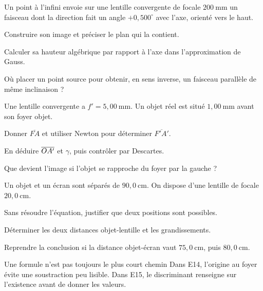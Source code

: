 Un point à l'infini envoie sur une lentille convergente de focale $200\ \mathrm{mm}$ un faisceau dont la direction fait un angle $+0{,}500^\circ$ avec l'axe, orienté vers le haut.
\begin{questions}
\item Construire son image et préciser le plan qui la contient.
\item Calculer sa hauteur algébrique par rapport à l'axe dans l'approximation de Gauss.
\item Où placer un point source pour obtenir, en sens inverse, un faisceau parallèle de même inclinaison ?
\end{questions}
Une lentille convergente a $f'=5{,}00\ \mathrm{mm}$. Un objet réel est situé $1{,}00\ \mathrm{mm}$ avant son foyer objet.
\begin{questions}
\item Donner $\overline{FA}$ et utiliser Newton pour déterminer $\overline{F'A'}$.
\item En déduire $\overline{OA'}$ et $\gamma$, puis contrôler par Descartes.
\item Que devient l'image si l'objet se rapproche du foyer par la gauche ?
\end{questions}
Un objet et un écran sont séparés de $90{,}0\ \mathrm{cm}$. On dispose d'une lentille de focale $20{,}0\ \mathrm{cm}$.
\begin{questions}
\item Sans résoudre l'équation, justifier que deux positions sont possibles.
\item Déterminer les deux distances objet-lentille et les grandissements.
\item Reprendre la conclusion si la distance objet-écran vaut $75{,}0\ \mathrm{cm}$, puis $80{,}0\ \mathrm{cm}$.
\end{questions}
\begin{methode}{Une formule n'est pas toujours le plus court chemin}
Dans E14, l'origine au foyer évite une soustraction peu lisible. Dans E15, le discriminant renseigne sur l'existence avant de donner les valeurs.
\end{methode}

